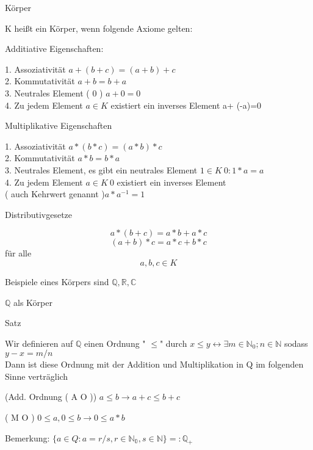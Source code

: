 \documentclass[headsepline,12pt,a4paper]{scrartcl}
\begin{document}
\begin{center}
\item[Körper]
\end{center}
\item K heißt ein Körper, wenn folgende Axiome gelten:
\begin{center}
\item[Additiative Eigenschaften:] 
\end{center}
1. Assoziativität $ a+(b+c) = (a+b)+c $ \\
2. Kommutativität $ a+b = b+a $ \\
3. Neutrales Element ( 0 ) $ a+0=0$\\
4. Zu jedem Element $a \in K $ existiert ein inverses Element a+ (-a)=0
\begin{center}
\item[Multiplikative Eigenschaften]
\end{center}
1. Assoziativität $ a*(b*c) = (a*b)*c $ \\
2. Kommutativität $ a*b = b*a $ \\
3. Neutrales Element, es gibt ein neutrales Element $ 1 \in K \ {0} : 1* a = a $\\
4. Zu jedem Element $a \in K \ {0} $ existiert ein inverses Element \\
( auch Kehrwert genannt )$a * a^{-1} = 1 $
\begin{center}
\item[Distributivgesetze]
\end{center}
\item $$ a*(b+c) = a*b + a*c $$
$$ (a+b)*c = a*c + b*c $$ für alle $$a,b,c \in K $$
\item Beispiele eines Körpers sind $ \mathbb{Q} , \mathbb{R} , \mathbb{C} $

\item[$\mathbb{Q}$ als Körper]
\item[Satz]
\item Wir definieren auf $\mathbb{Q}$ einen Ordnung " $\leq $" durch $x \leq y \leftrightarrow \exists m \in \mathbb{N}_0 ; n \in \mathbb{N} $ sodass $ y-x = m/n $ \\
Dann ist diese Ordnung mit der Addition und Multiplikation in Q im folgenden Sinne verträglich 
\item (Add. Ordnung ( A O )) $ a \leq b \rightarrow a+c \leq b+c $
\item ( M O ) $ 0 \leq a , 0 \leq b \rightarrow 0 \leq a*b $
\item Bemerkung: $\{a \in Q : a = r/s ,  r \in \mathbb{N_0}, s\in \mathbb{N}\}=: \mathbb{Q}_+$
\end{document}
